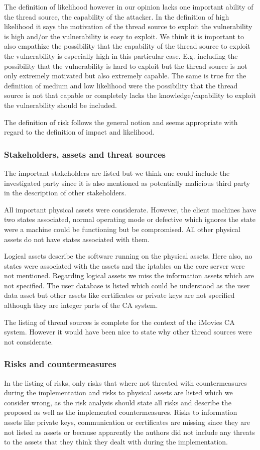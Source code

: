 \documentclass{report}
\begin{document}
The definition of likelihood however in our opinion lacks one important ability of the thread source, the capability of the attacker. In the definition of high likelihood it says the motivation of the thread source to exploit the vulnerability is high and/or the vulnerability is easy to exploit. We think it is important to also empathize the possibility that the capability of the thread source to exploit the vulnerability is especially high in this particular case. E.g. including the possibility that the vulnerability is hard to exploit but the thread source is not only extremely motivated but also extremely capable.\newline
The same is true for the definition of medium and low likelihood were the possibility that the thread source is not that capable or completely lacks the knowledge/capability to exploit the vulnerability should be included.

The definition of risk follows the general notion and seems appropriate with regard to the definition of impact and likelihood.
\subsubsection{Stakeholders, assets and threat sources}
The important stakeholders are listed but we think one could include the investigated party since it is also mentioned as potentially malicious third party in the description of other stakeholders.

All important physical assets were considerate. However, the client machines have two states associated, normal operating mode or defective which ignores the state were a machine could be functioning but be compromised. All other physical assets do not have states associated with them.

Logical assets describe the software running on the physical assets. Here also, no states were associated with the assets and the iptables on the core server were not mentioned. Regarding logical assets we miss the information assets which are not specified. The user database is listed which could be understood as the user data asset but other assets like certificates or private keys are not specified although they are integer parts of the CA system.

The listing of thread sources is complete for the context of the iMovies CA system. However it would have been nice to state why other thread sources were not considerate.
\subsubsection{Risks and countermeasures}
In the listing of risks, only risks that where not threated with countermeasures during the implementation and risks to physical assets are listed which we consider wrong, as the risk analysis should state all risks and describe the proposed as well as the implemented countermeasures. Risks to information assets like private keys, communication or certificates are missing since they are not listed as assets or because apparently the authors did not include any threats to the assets that they think they dealt with during the implementation. 
\end{document}
